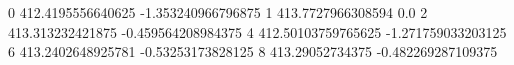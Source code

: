 0 412.4195556640625 -1.353240966796875
1 413.7727966308594 0.0
2 413.313232421875 -0.459564208984375
4 412.50103759765625 -1.271759033203125
6 413.2402648925781 -0.53253173828125
8 413.29052734375 -0.482269287109375
